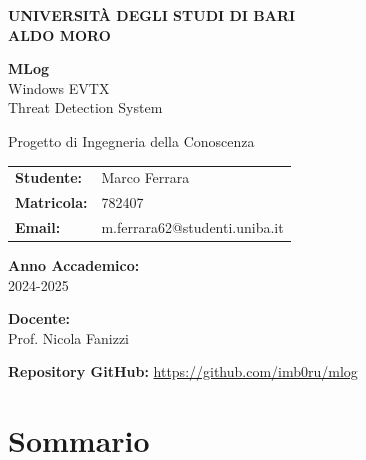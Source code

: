 \documentclass[12pt,a4paper]{report}
\theoremstyle{definition}
\newcommand{\universitylogo}{
    \begin{center}
        \Large
        \textbf{UNIVERSITÀ DEGLI STUDI DI BARI}\\
        \textbf{ALDO MORO}\\
        \vspace{2cm}
    \end{center}
}
\begin{document}
\begin{titlepage}
    \universitylogo
    
    \vspace{3cm}
    
    \begin{center}
        {\Huge \textbf{MLog}}\\
        \vspace{0.5cm}
        {\Large Windows EVTX}\\
        {\Large Threat Detection System}\\
        \vspace{2cm}
        
        {\large Progetto di Ingegneria della Conoscenza}\\
        \vspace{3cm}
        
        \begin{tabular}{ll}
            \textbf{Studente:} & Marco Ferrara \\
            \textbf{Matricola:} & 782407 \\
            \textbf{Email:} & m.ferrara62@studenti.uniba.it \\
        \end{tabular}
        
        \vspace{2cm}
        
        \textbf{Anno Accademico:}\\
        2024-2025\\
        
        \vspace{1cm}
        
        \textbf{Docente:}\\
        Prof. Nicola Fanizzi\\
        
        \vspace{2cm}
        
        \textbf{Repository GitHub:}
        \url{https://github.com/imb0ru/mlog}
    \end{center}
\end{titlepage}

\tableofcontents
\newpage

\chapter{Sommario}
\end{document}
